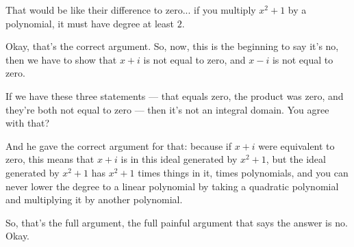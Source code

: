 \begin{student}
That would be like their difference to zero... if you multiply $x^2 + 1$ by a polynomial, it must have degree at least $2$.
\end{student}

\begin{speech}[01:17:43 - 01:18:56]
Okay, that's the correct argument. So, now, this is the beginning to say it's no, then we have to show that $x + i$ is not equal to zero, and $x - i$ is not equal to zero.  

If we have these three statements --- that equals zero, the product was zero, and they're both not equal to zero --- then it's not an integral domain. You agree with that? 

And he gave the correct argument for that: because if $x + i$ were equivalent to zero,  this means that $x + i$ is in this ideal generated by $x^2 + 1$,  but the ideal generated by $x^2 + 1$ has $x^2 + 1$ times things in it, times polynomials, and you can never lower the degree to a linear polynomial by taking a quadratic polynomial and multiplying it by another polynomial. 

So, that's the full argument, the full painful argument that says the answer is no. Okay.
\end{speech}

